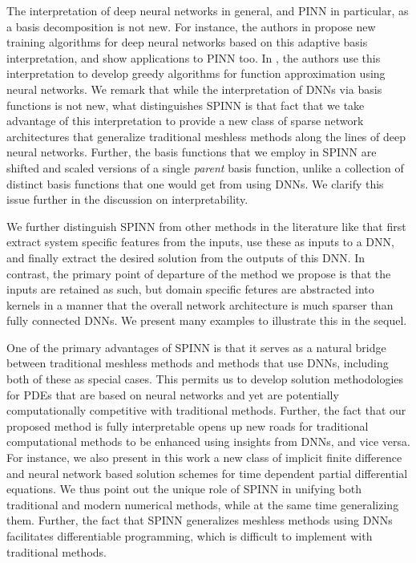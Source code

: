 \documentclass[12pt]{article}
\newcommand{\rr}[1]{#1}
\newcommand{\rb}[1]{#1}
\begin{document}
\rr{The interpretation of deep neural networks in general, and PINN in particular, as a basis decomposition is not new. For instance, the authors in \cite{CGPPT20} propose new training algorithms for deep neural networks based on this adaptive basis interpretation, and show applications to PINN too. In \cite{FO19}, the authors use this interpretation to develop greedy algorithms for function approximation using neural networks. We remark that while the interpretation of DNNs via basis functions is not new, what distinguishes SPINN is that fact that we take advantage of this interpretation to provide a new class of sparse network architectures that generalize traditional meshless methods along the lines of deep neural networks. Further, the basis functions that we employ in SPINN are shifted and scaled versions of a single \emph{parent} basis function, unlike a collection of distinct basis functions that one would get from using DNNs. We clarify this issue further in the discussion on interpretability.}

\rr{We further distinguish SPINN from other methods in the literature like \cite{WANG2021113938, YRK20, LPYWVJ21} that first extract system specific features from the inputs, use these as inputs to a DNN, and finally extract the desired solution from the outputs of this DNN. In contrast, the primary point of departure of the method we propose is that the inputs are retained as such, but domain specific fetures are abstracted into kernels in a manner that the overall network architecture is much sparser than fully connected DNNs. We present many examples to illustrate this in the sequel.}

One of the primary advantages of SPINN is that it serves as a natural bridge between traditional meshless methods and methods that use DNNs, including both of these as special cases. This permits us to develop solution methodologies for PDEs that are based on neural networks and yet are \rb{potentially} computationally competitive with traditional methods. Further, the fact that our proposed method is fully interpretable opens up new roads for traditional computational methods to be enhanced using insights from DNNs, and vice versa. For instance, we also present in this work a new class of implicit finite difference and neural network based solution schemes for time dependent partial differential equations. We thus point out the unique role of SPINN in unifying both traditional and modern numerical methods, while at the same time generalizing them. Further, the fact that SPINN generalizes meshless methods using DNNs facilitates differentiable programming, which is difficult to implement with traditional methods.
\end{document}
